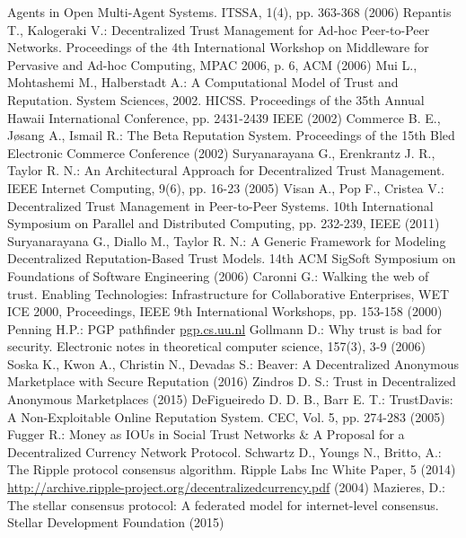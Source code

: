 \begin{thebibliography}{40}
  Agents in Open Multi-Agent Systems. ITSSA, 1(4), pp. 363-368 (2006)
  Repantis T., Kalogeraki V.: Decentralized Trust Management for Ad-hoc Peer-to-Peer Networks. Proceedings of the 4th
  International Workshop on Middleware for Pervasive and Ad-hoc Computing, MPAC 2006, p. 6, ACM (2006)
  Mui L., Mohtashemi M., Halberstadt A.: A Computational Model of Trust and Reputation. System Sciences, 2002. HICSS.
  Proceedings of the 35th Annual Hawaii International Conference, pp. 2431-2439 IEEE (2002)
  Commerce B. E., J\o{}sang A., Ismail R.: The Beta Reputation System. Proceedings of the 15th Bled Electronic Commerce
  Conference (2002)
  Suryanarayana G., Erenkrantz J. R., Taylor R. N.: An Architectural Approach for Decentralized Trust Management. IEEE
  Internet Computing, 9(6), pp. 16-23 (2005)
  Visan A., Pop F., Cristea V.: Decentralized Trust Management in Peer-to-Peer Systems. 10th International Symposium on
  Parallel and Distributed Computing, pp. 232-239, IEEE (2011)
  Suryanarayana G., Diallo M., Taylor R. N.: A Generic Framework for Modeling Decentralized Reputation-Based Trust Models.
  14th ACM SigSoft Symposium on Foundations of Software Engineering (2006)
  Caronni G.: Walking the web of trust. Enabling Technologies: Infrastructure for Collaborative Enterprises, WET ICE 2000,
  Proceedings, IEEE 9th International Workshops, pp. 153-158 (2000)
  Penning H.P.: PGP pathfinder \url{pgp.cs.uu.nl}
  Gollmann D.: Why trust is bad for security. Electronic notes in theoretical computer science, 157(3), 3-9 (2006)
  Soska K., Kwon A., Christin N., Devadas S.: Beaver: A Decentralized Anonymous Marketplace with Secure Reputation (2016)
  Zindros D. S.: Trust in Decentralized Anonymous Marketplaces (2015)
  DeFigueiredo D. D. B., Barr E. T.: TrustDavis: A Non-Exploitable Online Reputation System. CEC, Vol. 5, pp. 274-283
  (2005)
  Fugger R.: Money as IOUs in Social Trust Networks \& A Proposal for a Decentralized Currency Network Protocol.
  Schwartz D., Youngs N., Britto, A.: The Ripple protocol consensus algorithm. Ripple Labs Inc White Paper, 5 (2014)
  \url{http://archive.ripple-project.org/decentralizedcurrency.pdf} (2004)
  Mazieres, D.: The stellar consensus protocol: A federated model for internet-level consensus. Stellar Development
  Foundation (2015)

\end{thebibliography}
